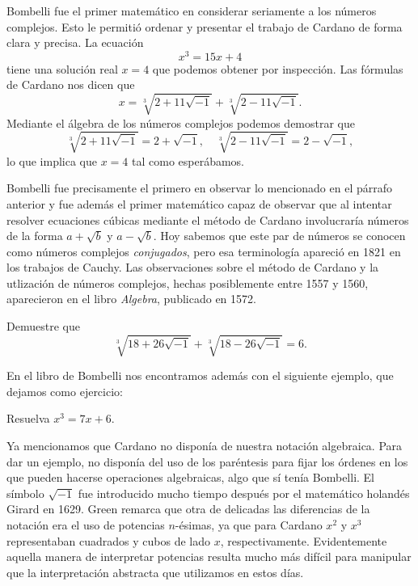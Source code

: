 

Bombelli fue el primer matemático en considerar seriamente a los números
complejos.  Esto le permitió ordenar y presentar el trabajo de Cardano de forma
clara y precisa.  La ecuación
\[
x^3=15x+4
\]
tiene una solución real $x=4$ que podemos obtener por inspección. Las fórmulas
de Cardano nos dicen que
\[
	x=\sqrt[3]{2+11\sqrt{-1}}+\sqrt[3]{2-11\sqrt{-1}}.
\]
Mediante el álgebra de los números complejos podemos demostrar que
\[
	\sqrt[3]{2+11\sqrt{-1}}=2+\sqrt{-1},\quad
	\sqrt[3]{2-11\sqrt{-1}}=2-\sqrt{-1},
\]
lo que implica que $x=4$ tal como esperábamos. 

Bombelli fue precisamente el primero en observar lo mencionado en el párrafo
anterior y fue además el primer matemático capaz de observar que al intentar
resolver ecuaciones cúbicas mediante el método de Cardano involucraría números
de la forma $a+\sqrt{b}$ y $a-\sqrt{b}$. Hoy sabemos que este par de números se
conocen como números complejos \emph{conjugados}, pero esa terminología
apareció en 1821 en los trabajos de Cauchy. Las observaciones sobre el método
de Cardano y la utlización de números complejos, hechas posiblemente entre 1557
y 1560, aparecieron en el libro \emph{Algebra}, publicado en 1572.

\begin{exercise}
	Demuestre que
	\[
		\sqrt[3]{18+26\sqrt{-1}}+\sqrt[3]{18-26\sqrt{-1}}=6.
	\]
\end{exercise}

En el libro de Bombelli nos encontramos además con el siguiente ejemplo, que
dejamos como ejercicio:

\begin{exercise}
	Resuelva $x^3=7x+6$. 
\end{exercise}

Ya mencionamos que Cardano no disponía de nuestra notación algebraica. Para dar
un ejemplo, no disponía del uso de los paréntesis para fijar los órdenes en los
que pueden hacerse operaciones algebraicas, algo que sí tenía Bombelli. El
símbolo $\sqrt{-1}$ fue introducido mucho tiempo después por el matemático
holandés Girard en 1629. Green remarca que otra de delicadas las diferencias de
la notación era el uso de potencias $n$-ésimas, ya que para Cardano $x^2$ y
$x^3$ representaban cuadrados y cubos de lado $x$, respectivamente.
Evidentemente aquella manera de interpretar potencias resulta mucho más difícil
para manipular que la interpretación abstracta que utilizamos en estos días. 

